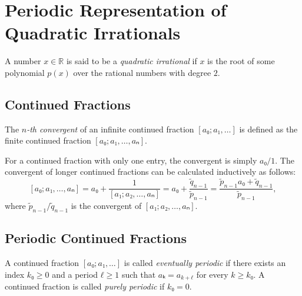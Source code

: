 \chapter{Periodic Representation of Quadratic Irrationals}

\begin{definition}
  A number $x ∈ ℝ$ is said to be a \emph{quadratic irrational} if $x$ is the root of some
  polynomial $p(x)$ over the rational numbers with degree $2$.
\end{definition}

\section{Continued Fractions}

\begin{definition}
\end{definition}

\begin{definition}
  The \emph{$n$-th convergent} of an infinite continued fraction $[a₀; a₁, …]$ is
  defined as the finite continued fraction $[a₀; a₁, …, aₙ]$.
\end{definition}

For a continued fraction with only one entry, the convergent is simply $a₀/1$.
The convergent of longer continued fractions can be calculated inductively as follows:
\[
  [a₀; a₁, …, aₙ]
  = a₀ + \frac{1}{[a₁; a₂, …, aₙ]}
  = a₀ + \frac{\tilde q_{n-1}}{\tilde p_{n-1}}
  = \frac{\tilde p_{n-1} a₀ + \tilde q_{n-1}}{\tilde p_{n-1}},
\]
where $\tilde p_{n-1} / \tilde q_{n-1}$ is the convergent of $[a₁; a₂, …, aₙ]$.

\begin{example}
\end{example}

\section{Periodic Continued Fractions}

\begin{definition}
  A continued fraction $[a₀; a₁, …]$ is called \emph{eventually periodic}
  if there exists an index $k₀ ≥ 0$ and a period $ℓ ≥ 1$ such that $aₖ = a_{k+ℓ}$ for every $k ≥ k₀$.
  A continued fraction is called \emph{purely periodic} if $k₀ = 0$.
\end{definition}

